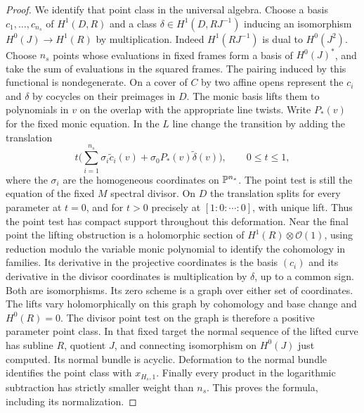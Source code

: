 \begin{proof}
We identify that point class in the universal algebra. Choose a basis
$c_1,\ldots,c_{n_s}$ of $H^1(D,R)$ and a class
$\delta\in H^1(D,RJ^{-1})$ inducing an isomorphism
$H^0(J)\to H^1(R)$ by multiplication. Indeed $H^1(RJ^{-1})$ is
dual to $H^0(J^2)$. Choose $n_s$ points whose evaluations in fixed
frames form a basis of $H^0(J)^*$, and take the sum of evaluations in
the squared frames. The pairing induced by this functional is
nondegenerate. On a cover of $C$ by two affine opens represent the
$c_i$ and $\delta$ by cocycles on their preimages in $D$. The monic
basis lifts them to polynomials in $v$ on the overlap with the
appropriate line twists. Write $P_*(v)$ for the fixed monic equation.
In the $L$ line change the transition by adding the translation
\[
  t\Big(\sum_{i=1}^{n_s}\sigma_i\widetilde c_i(v)
     +\sigma_0 P_*(v)\widetilde\delta(v)\Big),
       \qquad 0\le t\le1 ,
\]
where the $\sigma_i$ are the homogeneous coordinates on
$\mathbb P^{n_s}$. The point test is still the equation of the fixed $M$ spectral divisor. On $D$ the translation splits for every parameter at $t=0$,
and for $t>0$ precisely at $[1:0:\cdots:0]$, with unique lift.
Thus the point test has compact support throughout this deformation.
Near the final point the lifting obstruction is a holomorphic section
of $H^1(R)\otimes\mathcal O(1)$, using reduction modulo the variable
monic polynomial to identify the cohomology in families.
Its derivative in the projective coordinates is the basis $(c_i)$
and its derivative in the divisor coordinates is multiplication by
$\delta$, up to a common sign. Both are isomorphisms. Its zero
scheme is a graph over either set of coordinates. The lifts vary
holomorphically on this graph by cohomology and base change and
$H^0(R)=0$. The divisor point test on the graph is therefore a
positive parameter point class. In that fixed target the normal
sequence of the lifted curve has subline $R$, quotient $J$, and
connecting isomorphism on $H^0(J)$ just computed. Its normal bundle
is acyclic. Deformation to the normal bundle identifies the point
class with $x_{H_s,1}$. Finally every product in the logarithmic
subtraction has strictly smaller weight than $n_s$. This proves the
formula, including its normalization.
\end{proof}
